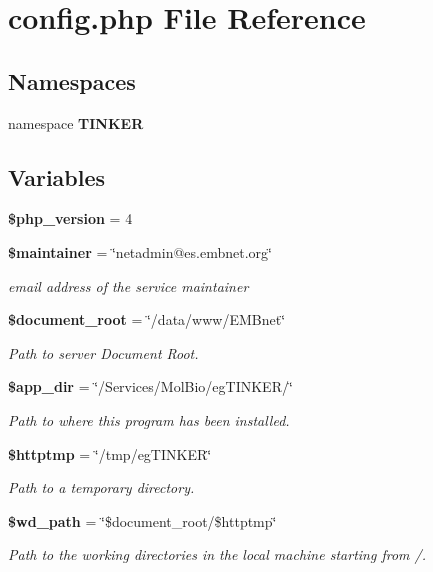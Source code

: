 \section{config.php File Reference}
\label{config_8php}
\subsection*{Namespaces}
\begin{CompactItemize}
\item 
namespace {\bf TINKER}
\end{CompactItemize}
\subsection*{Variables}
\begin{CompactItemize}
\item 
{\bf \$php\_\-version} = 4
\item 
{\bf \$maintainer} = \char`\"{}netadmin@es.embnet.org\char`\"{}
\begin{CompactList}\small\item\em email address of the service maintainer \item\end{CompactList}\item 
{\bf \$document\_\-root} = \char`\"{}/data/www/EMBnet\char`\"{}
\begin{CompactList}\small\item\em Path to server Document Root. \item\end{CompactList}\item 
{\bf \$app\_\-dir} = \char`\"{}/Services/Mol\-Bio/eg\-TINKER/\char`\"{}
\begin{CompactList}\small\item\em Path to where this program has been installed. \item\end{CompactList}\item 
{\bf \$httptmp} = \char`\"{}/tmp/eg\-TINKER\char`\"{}
\begin{CompactList}\small\item\em Path to a temporary directory. \item\end{CompactList}\item 
{\bf \$wd\_\-path} = \char`\"{}\$document\_\-root/\$httptmp\char`\"{}
\begin{CompactList}\small\item\em Path to the working directories in the local machine starting from /. \item\end{CompactList}\item 

\end{CompactItemize}
